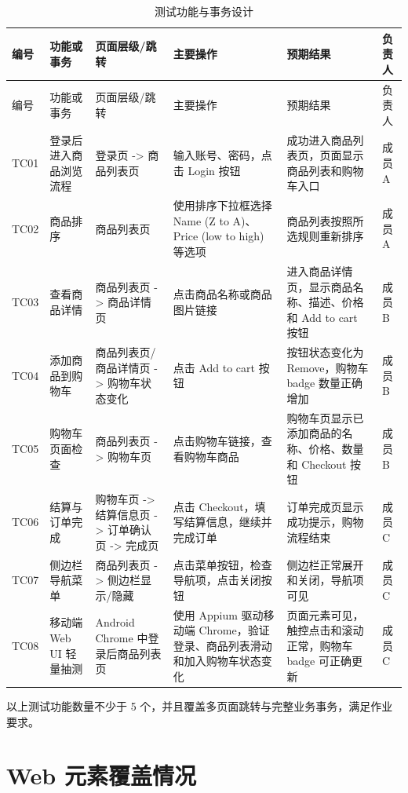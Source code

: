 \documentclass[UTF8,a4paper,12pt]{ctexart}
\begin{document}
\begingroup
\scriptsize
\setlength{\tabcolsep}{2pt}
\begin{longtable}{p{1.1cm}p{2.2cm}p{2.7cm}p{2.7cm}p{3.8cm}p{1.2cm}}
\caption{测试功能与事务设计}\\
\toprule
编号 & 功能或事务 & 页面层级/跳转 & 主要操作 & 预期结果 & 负责人 \\
\midrule
\endfirsthead
\toprule
编号 & 功能或事务 & 页面层级/跳转 & 主要操作 & 预期结果 & 负责人 \\
\midrule
\endhead
TC01 & 登录后进入商品浏览流程 & 登录页 -> 商品列表页 & 输入账号、密码，点击 Login 按钮 & 成功进入商品列表页，页面显示商品列表和购物车入口 & 成员 A \\
TC02 & 商品排序 & 商品列表页 & 使用排序下拉框选择 Name (Z to A)、Price (low to high) 等选项 & 商品列表按照所选规则重新排序 & 成员 A \\
TC03 & 查看商品详情 & 商品列表页 -> 商品详情页 & 点击商品名称或商品图片链接 & 进入商品详情页，显示商品名称、描述、价格和 Add to cart 按钮 & 成员 B \\
TC04 & 添加商品到购物车 & 商品列表页/商品详情页 -> 购物车状态变化 & 点击 Add to cart 按钮 & 按钮状态变化为 Remove，购物车 badge 数量正确增加 & 成员 B \\
TC05 & 购物车页面检查 & 商品列表页 -> 购物车页 & 点击购物车链接，查看购物车商品 & 购物车页显示已添加商品的名称、价格、数量和 Checkout 按钮 & 成员 B \\
TC06 & 结算与订单完成 & 购物车页 -> 结算信息页 -> 订单确认页 -> 完成页 & 点击 Checkout，填写结算信息，继续并完成订单 & 订单完成页显示成功提示，购物流程结束 & 成员 C \\
TC07 & 侧边栏导航菜单 & 商品列表页 -> 侧边栏显示/隐藏 & 点击菜单按钮，检查导航项，点击关闭按钮 & 侧边栏正常展开和关闭，导航项可见 & 成员 C \\
TC08 & 移动端 Web UI 轻量抽测 & Android Chrome 中登录后商品列表页 & 使用 Appium 驱动移动端 Chrome，验证登录、商品列表滑动和加入购物车状态变化 & 页面元素可见，触控点击和滚动正常，购物车 badge 可正确更新 & 成员 C \\
\bottomrule
\end{longtable}
\endgroup

以上测试功能数量不少于 5 个，并且覆盖多页面跳转与完整业务事务，满足作业要求。

\section{Web 元素覆盖情况}
\end{document}
